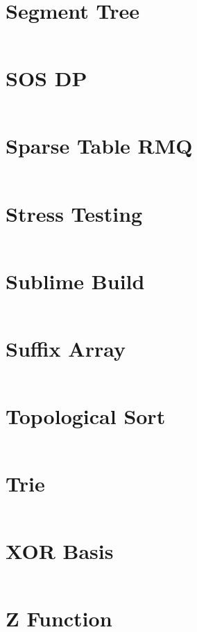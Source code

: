 \documentclass[10pt,a4paper,landscape]{article}
\begin{document}
\begin{multicols*}{3}
		\section{Segment Tree}
		\inputminted{cpp}{codes/SEGMENT_TREE.cpp}
		
		\section{SOS DP}
		\inputminted{cpp}{codes/SOS_DP.cpp}
		
		\section{Sparse Table RMQ}
		\inputminted{cpp}{codes/SPARSE_TABLE_RMQ.cpp}
		
		\section{Stress Testing}
		\inputminted{cpp}{codes/STRESS_TESTING.cpp}
		
		\section{Sublime Build}
		\inputminted{cpp}{codes/SUBLIME_BUILD.cpp}
		
		\section{Suffix Array}
		\inputminted{cpp}{codes/SUFFIX_ARRAY.cpp}
		
		\section{Topological Sort}
		\inputminted{cpp}{codes/TOPOLOGICAL_SORT.cpp}
		
		\section{Trie}
		\inputminted{cpp}{codes/TRIE.cpp}
		
		\section{XOR Basis}
		\inputminted{cpp}{codes/XOR_BASIS.cpp}
		
		\section{Z Function}
		\inputminted{cpp}{codes/Z_FUNCTION.cpp}
		

\end{multicols*}
\end{document}
